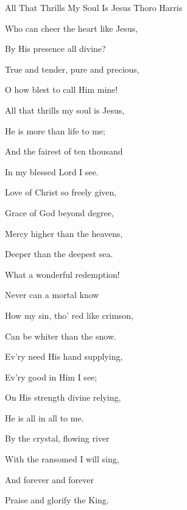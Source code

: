 \documentclass[12pt]{book}
\begin{document}
\begin{song}{All That Thrills My Soul Is Jesus}{}
  {\SBPubDom}
  {Thoro Harris}
  {}
  {}

  \begin{SBVerse}
    Who can cheer the heart like Jesus,

    By His presence all divine?

    True and tender, pure and precious,

    O how blest to call Him mine!
  \end{SBVerse}

  \begin{SBOpGroup}
    All that thrills my soul is Jesus,

    He is more than life to me;

    And the fairest of ten thousand

    In my blessed Lord I see.
  \end{SBOpGroup}

  \begin{SBVerse}
    Love of Christ so freely given,

    Grace of God beyond degree,

    Mercy higher than the heavens,

    Deeper than the deepest sea.
  \end{SBVerse}

  \begin{SBVerse}
    What a wonderful redemption!

    Never can a mortal know

    How my sin, tho' red like crimson,

    Can be whiter than the snow.
  \end{SBVerse}

  \begin{SBVerse}
    Ev'ry need His hand supplying,

    Ev'ry good in Him I see;

    On His strength divine relying,

    He is all in all to me.
  \end{SBVerse}

  \begin{SBVerse}
    By the crystal, flowing river

    With the ransomed I will sing,

    And forever and forever

    Praise and glorify the King.
  \end{SBVerse}
\end{song}
\end{document}
